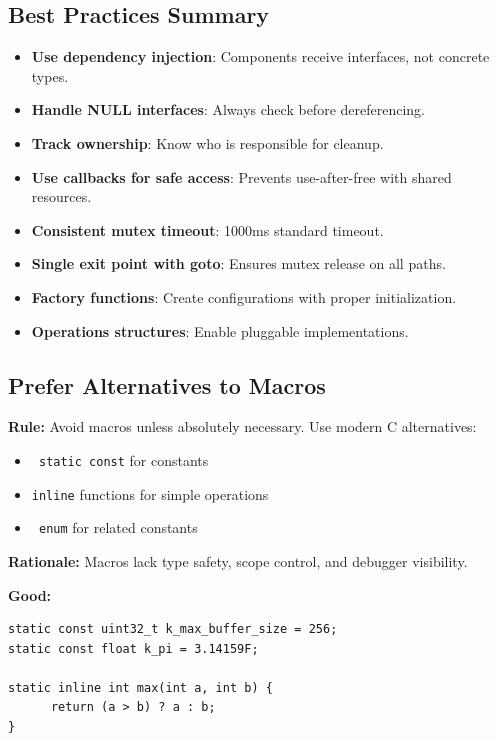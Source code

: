 \subsection{Best Practices Summary}

\begin{itemize}
    \item \textbf{Use dependency injection}: Components receive interfaces, not concrete types.
    \item \textbf{Handle NULL interfaces}: Always check before dereferencing.
    \item \textbf{Track ownership}: Know who is responsible for cleanup.
    \item \textbf{Use callbacks for safe access}: Prevents use-after-free with shared resources.
    \item \textbf{Consistent mutex timeout}: 1000ms standard timeout.
    \item \textbf{Single exit point with goto}: Ensures mutex release on all paths.
    \item \textbf{Factory functions}: Create configurations with proper initialization.
    \item \textbf{Operations structures}: Enable pluggable implementations.
\end{itemize}



\subsection{Prefer Alternatives to Macros}

\textbf{Rule:} Avoid macros unless absolutely necessary. Use modern C alternatives:

\begin{itemize}
    \item \texttt{
      static const} for constants
    \item \texttt{inline} functions for simple operations
    \item \texttt{
      enum} for related constants
\end{itemize}

\textbf{Rationale:} Macros lack type safety, scope control, and debugger visibility.

\textbf{Good:}
\begin{verbatim}
static const uint32_t k_max_buffer_size = 256;
static const float k_pi = 3.14159F;

static inline int max(int a, int b) {
      return (a > b) ? a : b;
}
\end{verbatim}

